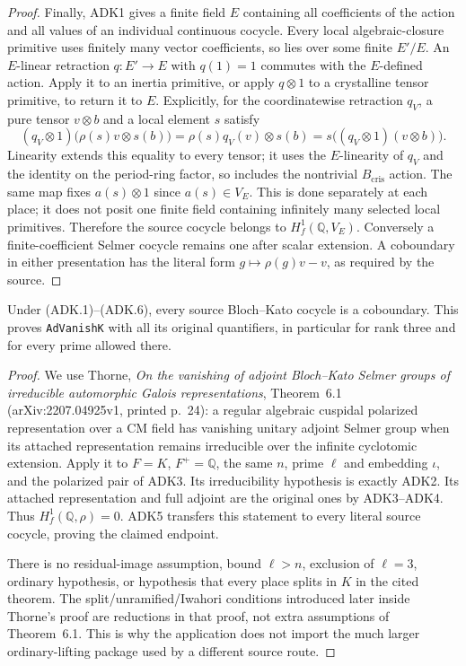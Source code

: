 \begin{proof}
Finally, ADK1 gives a finite field $E$ containing all coefficients
of the action and all values of an individual continuous cocycle.
Every local algebraic-closure primitive uses finitely many vector
coefficients, so lies over some finite $E'/E$.  An $E$-linear
retraction $q:E'\to E$ with $q(1)=1$ commutes with the $E$-defined
action.  Apply it to an inertia primitive, or apply
$q\otimes1$ to a crystalline tensor primitive, to return it to
$E$.  Explicitly, for the coordinatewise retraction $q_V$, a pure
tensor $v\otimes b$ and a local element $s$ satisfy
\[
 (q_V\otimes1)\bigl(\rho(s)v\otimes s(b)\bigr)
     =\rho(s)q_V(v)\otimes s(b)
     =s\bigl((q_V\otimes1)(v\otimes b)\bigr).
\]
Linearity extends this equality to every tensor; it uses the
$E$-linearity of $q_V$ and the identity on the period-ring factor,
so includes the nontrivial $B_{\mathrm{cris}}$ action.  The same map
fixes $a(s)\otimes1$ since $a(s)\in V_E$.
This is done separately at each place; it does not posit one
finite field containing infinitely many selected local primitives.
Therefore the source cocycle belongs to $H^1_f(\mathbb Q,V_E)$.
Conversely a finite-coefficient Selmer cocycle remains one after
scalar extension.  A coboundary in either presentation has the
literal form $g\mapsto\rho(g)v-v$, as required by the source.
\end{proof}

\begin{theorem}
\label{claim:ADK6}
Under (ADK.1)--(ADK.6), every source Bloch--Kato cocycle is a
coboundary.  This proves \texttt{AdVanishK} with all its original
quantifiers, in particular for rank three and for every prime
allowed there.
\end{theorem}
\begin{proof}
We use Thorne, \emph{On the vanishing of adjoint Bloch--Kato Selmer
groups of irreducible automorphic Galois representations},
Theorem~6.1 (arXiv:2207.04925v1, printed p.~24): a regular algebraic
cuspidal polarized representation over a CM field has vanishing
unitary adjoint Selmer group when its attached representation
remains irreducible over the infinite cyclotomic extension.
Apply it to $F=K$, $F^+=\mathbb Q$, the same $n$, prime $\ell$ and
embedding $\iota$, and the polarized pair of ADK3.  Its
irreducibility hypothesis is exactly ADK2.  Its attached
representation and full adjoint are the original ones by ADK3--ADK4.
Thus $H^1_f(\mathbb Q,\rho)=0$.  ADK5 transfers this statement to
every literal source cocycle, proving the claimed endpoint.

There is no residual-image assumption, bound $\ell>n$, exclusion of
$\ell=3$, ordinary hypothesis, or hypothesis that every place splits
in $K$ in the cited theorem.  The split/unramified/Iwahori conditions
introduced later inside Thorne's proof are reductions in that proof,
not extra assumptions of Theorem~6.1.  This is why the application
does not import the much larger ordinary-lifting package used by a
different source route.
\end{proof}

